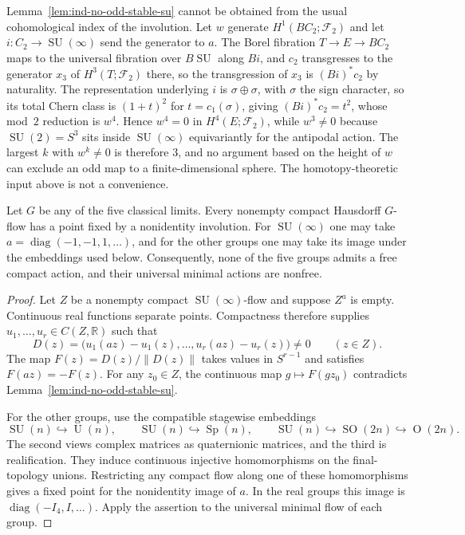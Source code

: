 \begin{remark}\label{rem:ind-index-three}
Lemma~\ref{lem:ind-no-odd-stable-su} cannot be obtained from the usual
cohomological index of the involution. Let $w$ generate
$H^1(BC_2;\mathcal F_2)$ and let $i:C_2\to\operatorname{SU}(\infty)$ send the generator to
$a$. The Borel fibration $T\to E\to BC_2$ maps to the universal
fibration over $B\operatorname{SU}$ along $Bi$, and $c_2$ transgresses to the
generator $x_3$ of $H^3(T;\mathcal F_2)$ there, so the transgression of $x_3$
is $(Bi)^*c_2$ by naturality. The representation underlying $i$ is
$\sigma\oplus\sigma$, with $\sigma$ the sign character, so its total
Chern class is $(1+t)^2$ for $t=c_1(\sigma)$, giving
$(Bi)^*c_2=t^2$, whose mod~$2$ reduction is $w^4$. Hence $w^4=0$ in
$H^4(E;\mathcal F_2)$, while $w^3\ne0$ because $\operatorname{SU}(2)=S^3$ sits inside
$\operatorname{SU}(\infty)$ equivariantly for the antipodal action. The largest
$k$ with $w^k\ne0$ is therefore $3$, and no argument based on the
height of $w$ can exclude an odd map to a finite-dimensional sphere.
The homotopy-theoretic input above is not a convenience.
\end{remark}

\begin{proposition}\label{prop:ind-involution-fixed}
Let $G$ be any of the five classical limits. Every nonempty compact
Hausdorff $G$-flow has a point fixed by a nonidentity involution. For
$\operatorname{SU}(\infty)$ one may take $a=\operatorname{diag}(-1,-1,1,\ldots)$, and for the
other groups one may take its image under the embeddings used below.
Consequently, none of the five groups admits a free compact action, and
their universal minimal actions are nonfree.
\end{proposition}

\begin{proof}
Let $Z$ be a nonempty compact $\operatorname{SU}(\infty)$-flow and suppose $Z^a$ is
empty. Continuous real functions separate points. Compactness
therefore supplies $u_1,\ldots,u_r\in C(Z,\mathbb R)$ such that
\[
D(z)=\bigl(u_1(az)-u_1(z),\ldots,u_r(az)-u_r(z)\bigr)\ne0
\qquad(z\in Z).
\]
The map $F(z)=D(z)/\lVert D(z)\rVert$ takes values in $S^{r-1}$ and
satisfies $F(az)=-F(z)$. For any $z_0\in Z$, the continuous map
$g\mapsto F(gz_0)$ contradicts Lemma~\ref{lem:ind-no-odd-stable-su}.

For the other groups, use the compatible stagewise embeddings
\[
\operatorname{SU}(n)\hookrightarrow\operatorname{U}(n),\qquad
\operatorname{SU}(n)\hookrightarrow\operatorname{Sp}(n),\qquad
\operatorname{SU}(n)\hookrightarrow\operatorname{SO}(2n)\hookrightarrow\operatorname{O}(2n).
\]
The second views complex matrices as quaternionic matrices, and
the third is realification. They induce continuous injective
homomorphisms on the final-topology unions. Restricting any compact
flow along one of these homomorphisms gives a fixed point for the
nonidentity image of $a$. In the real groups this image is
$\operatorname{diag}(-I_4,I,\ldots)$. Apply the assertion to the universal
minimal flow of each group.
\end{proof}

